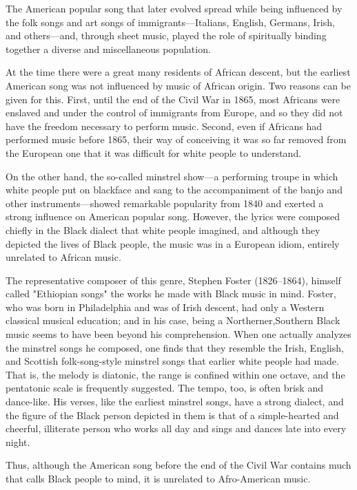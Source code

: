 The American popular song that later evolved spread while being influenced by the folk songs and art songs of immigrants—Italians, English, Germans, Irish, and others—and, through sheet music, played the role of spiritually binding together a diverse and miscellaneous population.

At the time there were a great many residents of African descent, but the earliest American song was not influenced by music of African origin. Two reasons can be given for this. First, until the end of the Civil War in 1865, most Africans were enslaved and under the control of immigrants from Europe, and so they did not have the freedom necessary to perform music. Second, even if Africans had performed music before 1865, their way of conceiving it was so far removed from the European one that it was difficult for white people to understand.

On the other hand, the so-called minstrel show—a performing troupe in which white people put on blackface and sang to the accompaniment of the banjo and other instruments—showed remarkable popularity from 1840 and exerted a strong influence on American popular song. However, the lyrics were composed chiefly in the Black dialect that white people imagined, and although they depicted the lives of Black people, the music was in a European idiom, entirely unrelated to African music.

The representative composer of this genre, Stephen Foster (1826–1864), himself called "Ethiopian songs" the works he made with Black music in mind. Foster, who was born in Philadelphia and was of Irish descent, had only a Western classical musical education; and in his case, being a Northerner,Southern Black music seems to have been beyond his comprehension. When one actually analyzes the minstrel songs he composed, one finds that they resemble the Irish, English, and Scottish folk-song-style minstrel songs that earlier white people had made. That is, the melody is diatonic, the range is confined within one octave, and the pentatonic scale is frequently suggested. The tempo, too, is often brisk and dance-like. His verses, like the earliest minstrel songs, have a strong dialect, and the figure of the Black person depicted in them is that of a simple-hearted and cheerful, illiterate person who works all day and sings and dances late into every night.

Thus, although the American song before the end of the Civil War contains much that calls Black people to mind, it is unrelated to Afro-American music.

